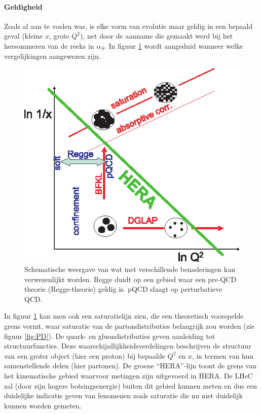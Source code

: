 \documentclass[a4paper,11pt]{article}
\numberwithin{equation}{section} %
\begin{document}
      \paragraph{Geldigheid}
Zoals al aan te voelen was, is elke vorm van evolutie maar geldig in een bepaald geval (kleine $x$, grote $Q^2$), net door de aanname die gemaakt werd bij het hersommeren van de reeks in $\alpha_S$.
In figuur \ref{fig:DGLAP-BFKL} wordt aangeduid wanneer welke vergelijkingen aangewezen zijn.
\begin{figure} [H]
  \begin{center}
    \includegraphics[scale=1]{Afbeeldingen/DGLAP-BFKL.eps}
    \caption{Schematische weergave van wat met verschillende benaderingen kan verwezenlijkt worden. Regge duidt op een gebied waar een pre-QCD theorie (Regge-theorie) geldig is. pQCD slaagt op perturbatieve QCD. \cite{Martin}}
   \label{fig:DGLAP-BFKL}
  \end{center}
\end{figure}
In figuur \ref{fig:DGLAP-BFKL} kan men ook een saturatielijn zien, die een theoretisch voorspelde grens vormt, waar saturatie van de partondistributies belangrijk zou worden (zie figuur \ref{fig:PD}).
De quark- en gluondistributies geven aanleiding tot structuurfuncties.
Deze waarschijnllijkheidsverdelingen beschrijven de structuur van een groter object (hier een proton) bij bepaalde $Q^2$ en $x$, in termen van hun samenstellende delen (hier partonen).
De groene “HERA”-lijn toont de grens van het kinematische gebied waarvoor metingen zijn uitgevoerd in HERA.
De LHeC zal (door zijn hogere botsingsenergie) buiten dit gebied kunnen meten en dus een duidelijke indicatie geven van fenomenen zoals saturatie die nu niet duidelijk kunnen worden gemeten.
\end{document}
